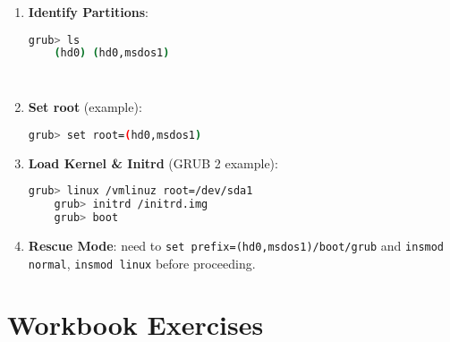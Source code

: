 \documentclass[12pt,a4paper]{report}
\begin{document}
\begin{enumerate}
    \item \textbf{Identify Partitions}: 
    \begin{lstlisting}[language=bash]
    grub> ls
    (hd0) (hd0,msdos1)
    \end{lstlisting} 
     \begin{lstlisting}[language=bash]
    
    \end{lstlisting}
    \item \textbf{Set root} (example):  
    \begin{lstlisting}[language=bash]
    grub> set root=(hd0,msdos1)
    \end{lstlisting}
    \item \textbf{Load Kernel \& Initrd} (GRUB 2 example):  
    \begin{lstlisting}[language=bash]
    grub> linux /vmlinuz root=/dev/sda1
    grub> initrd /initrd.img
    grub> boot
    \end{lstlisting}
    \item \textbf{Rescue Mode}: need to \texttt{set prefix=(hd0,msdos1)/boot/grub} and \texttt{insmod normal}, \texttt{insmod linux} before proceeding.
\end{enumerate}



\section*{Workbook Exercises}
\end{document}
